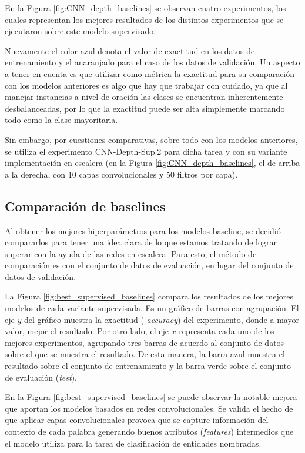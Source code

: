 En la Figura \ref{fig:CNN_depth_baselines} se observan cuatro experimentos, los cuales representan los mejores
resultados de los distintos experimentos que se ejecutaron sobre este modelo supervisado. 

Nuevamente el color azul denota el valor de exactitud en los datos de entrenamiento y el anaranjado para el 
caso de los datos de validación. Un aspecto a tener en cuenta es que utilizar como métrica la exactitud para 
su comparación con los modelos anteriores es algo que hay que trabajar con cuidado, ya que al manejar 
instancias a nivel de oración las clases se encuentran inherentemente desbalanceadas, por lo que la exactitud 
puede ser alta simplemente marcando todo como la clase mayoritaria.

Sin embargo, por cuestiones comparativas, sobre todo con los modelos anteriores, se utiliza el experimento 
CNN-Depth-Sup.2 para dicha tarea y con su variante implementación en escalera (en la Figura 
\ref{fig:CNN_depth_baselines}, el de arriba a la derecha, con 10 capas convolucionales y 50 filtros por capa).

\subsection{Comparación de baselines}

Al obtener los mejores hiperparámetros para los modelos baseline, se decidió compararlos para tener una idea 
clara de lo que estamos tratando de lograr superar con la ayuda de las redes en escalera. Para esto, el método
de comparación es con el conjunto de datos de evaluación, en lugar del conjunto de datos de validación.

La Figura \ref{fig:best_supervised_baselines} compara los resultados de los mejores modelos de cada variante 
supervisada. Es un gráfico de barras con agrupación. El eje $y$ del gráfico muestra la exactitud ({\em 
accuracy}) del experimento, donde a mayor valor, mejor el resultado. Por otro lado,
el eje $x$ representa cada uno de los mejores experimentos, 
agrupando tres barras de acuerdo al conjunto de datos sobre el que se muestra el resultado. De esta manera, la
barra azul muestra el resultado sobre el conjunto de entrenamiento y la barra verde sobre el conjunto de 
evaluación ({\em test}).

En la Figura \ref{fig:best_supervised_baselines} se puede observar la notable mejora que aportan los modelos 
basados en redes convolucionales. Se valida el hecho de que aplicar capas convolucionales provoca que se 
capture información del contexto de cada palabra generando buenos atributos ({\em features}) intermedios que 
el modelo utiliza para la tarea de clasificación de entidades nombradas. 

